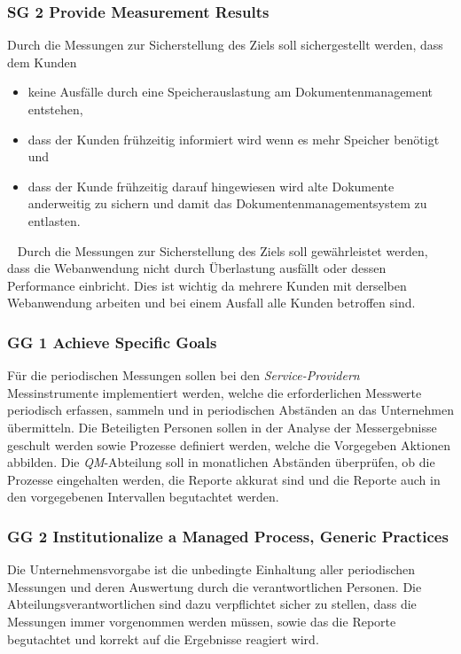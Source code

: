 \subsubsection{SG 2 Provide Measurement Results}
Durch die Messungen zur Sicherstellung des Ziels  soll sichergestellt werden, dass dem Kunden 
\begin{itemize}
	\item keine Ausfälle durch eine Speicherauslastung am Dokumentenmanagement entstehen,
	\item dass der Kunden frühzeitig informiert wird wenn es mehr Speicher benötigt und
	\item dass der Kunde frühzeitig darauf hingewiesen wird alte Dokumente anderweitig zu sichern und damit das Dokumentenmanagementsystem zu entlasten.
\end{itemize}
\ \newline
Durch die Messungen zur Sicherstellung des Ziels  soll gewährleistet werden, dass die Webanwendung nicht durch Überlastung ausfällt oder dessen Performance einbricht. Dies ist wichtig da mehrere Kunden mit derselben Webanwendung arbeiten und bei einem Ausfall  alle Kunden betroffen sind.

\subsubsection{GG 1 Achieve Specific Goals}
Für die periodischen Messungen sollen bei den \emph{Service-Providern} Messinstrumente implementiert werden, welche die erforderlichen Messwerte periodisch erfassen, sammeln und in periodischen Abständen an das Unternehmen übermitteln. Die Beteiligten Personen sollen in der Analyse der Messergebnisse geschult werden sowie Prozesse definiert werden, welche die Vorgegeben Aktionen abbilden. Die \emph{QM}-Abteilung soll in monatlichen Abständen überprüfen, ob die Prozesse eingehalten werden, die Reporte akkurat sind und die Reporte auch in den vorgegebenen Intervallen begutachtet werden.

\subsubsection{GG 2 Institutionalize a Managed Process, Generic Practices}
Die Unternehmensvorgabe ist die unbedingte Einhaltung aller periodischen Messungen und deren Auswertung durch die verantwortlichen Personen. Die Abteilungsverantwortlichen sind dazu verpflichtet sicher zu stellen, dass die Messungen immer vorgenommen werden müssen, sowie das die Reporte begutachtet und korrekt auf die Ergebnisse reagiert wird.
\newline
\newline
